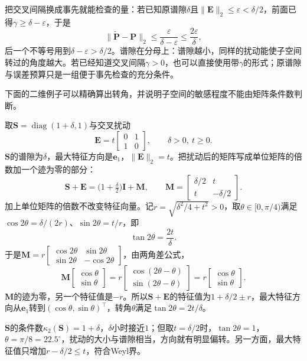 把交叉间隔换成事先就能检查的量：若已知原谱隙$\delta$且$\lVert\bm E\rVert_2\leq\varepsilon<\delta/2$，前面已得$\gamma\geq\delta-\varepsilon$，于是
\[
 \lVert\widetilde{\bm P}-\bm P\rVert_2\leq\frac{\varepsilon}{\delta-\varepsilon}\leq\frac{2\varepsilon}{\delta},
\]
后一个不等号用到$\delta-\varepsilon>\delta/2$。谱隙在分母上：谱隙越小，同样的扰动能使子空间转过的角度越大。若已经知道交叉间隔$\gamma>0$，也可以直接使用带$\gamma$的形式；原谱隙与误差预算只是一组便于事先检查的充分条件。

下面的二维例子可以精确算出转角，并说明子空间的敏感程度不能由矩阵条件数判断。
\begin{example}[谱隙与特征方向的转角]
\label{ex:ls-gap-direction-rotation}
取$\bm S=\operatorname{diag}(1+\delta,1)$与交叉扰动
\[
 \bm E=t\begin{bmatrix}0&1\\1&0\end{bmatrix},\qquad\delta>0,\ t\geq0 .
\]
$\bm S$的谱隙为$\delta$，最大特征方向是$\bm e_1$，$\lVert\bm E\rVert_2=t$。把扰动后的矩阵写成单位矩阵的倍数加一个迹为零的部分：
\[
 \bm S+\bm E=\bigl(1+\tfrac\delta2\bigr)\bm I+\bm M,\qquad
 \bm M=\begin{bmatrix}\delta/2&t\\t&-\delta/2\end{bmatrix}.
\]
加上单位矩阵的倍数不改变特征向量。记$r=\sqrt{\delta^2/4+t^2}>0$，取$\theta\in[0,\pi/4)$满足$\cos2\theta=\delta/(2r)$、$\sin2\theta=t/r$，即
\[
 \tan2\theta=\frac{2t}{\delta}.
\]
于是$\bm M=r\left[\begin{smallmatrix}\cos2\theta&\sin2\theta\\\sin2\theta&-\cos2\theta\end{smallmatrix}\right]$，由两角差公式，
\[
 \bm M\begin{bmatrix}\cos\theta\\\sin\theta\end{bmatrix}
 =r\begin{bmatrix}\cos(2\theta-\theta)\\\sin(2\theta-\theta)\end{bmatrix}
 =r\begin{bmatrix}\cos\theta\\\sin\theta\end{bmatrix}.
\]
$\bm M$的迹为零，另一个特征值是$-r$。所以$\bm S+\bm E$的特征值为$1+\delta/2\pm r$，最大特征方向从$\bm e_1$转到$(\cos\theta,\sin\theta)^\top$，转角$\theta$满足$\tan2\theta=2t/\delta$。

$\bm S$的条件数$\kappa_2(\bm S)=1+\delta$，$\delta$小时接近$1$；但取$t=\delta/2$时，$\tan2\theta=1$，$\theta=\pi/8=22.5^\circ$，扰动的大小与谱隙相当，方向就有明显偏转。另一方面，最大特征值只增加$r-\delta/2\leq t$，符合Weyl界。
\end{example}
